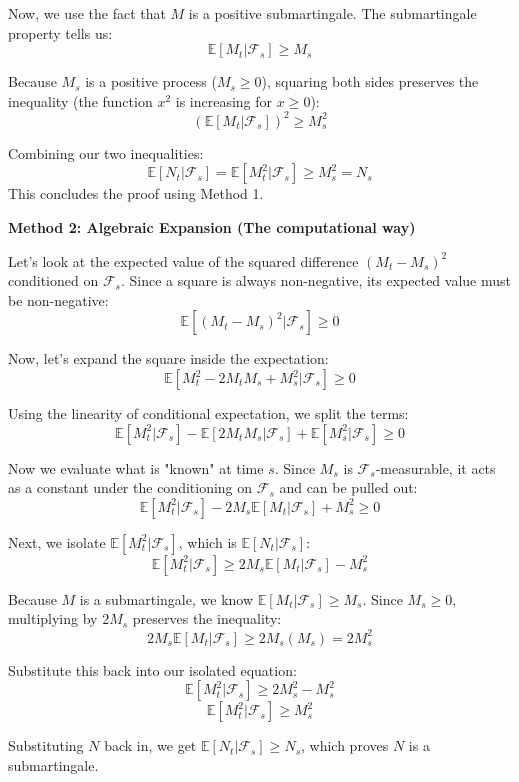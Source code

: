 Now, we use the fact that $M$ is a positive submartingale. The submartingale property tells us:
\[ \mathbb{E}[M_t | \mathcal{F}_s] \ge M_s \]

Because $M_s$ is a positive process ($M_s \ge 0$), squaring both sides preserves the inequality (the function $x^2$ is increasing for $x \ge 0$):
\[ (\mathbb{E}[M_t | \mathcal{F}_s])^2 \ge M_s^2 \]

Combining our two inequalities:
\[ \mathbb{E}[N_t | \mathcal{F}_s] = \mathbb{E}[M_t^2 | \mathcal{F}_s] \ge M_s^2 = N_s \]
This concludes the proof using Method 1.

\vspace{0.5cm}
\textbf{Method 2: Algebraic Expansion (The computational way)}

Let's look at the expected value of the squared difference $(M_t - M_s)^2$ conditioned on $\mathcal{F}_s$. Since a square is always non-negative, its expected value must be non-negative:
\[ \mathbb{E}[(M_t - M_s)^2 | \mathcal{F}_s] \ge 0 \]

Now, let's expand the square inside the expectation:
\[ \mathbb{E}[M_t^2 - 2M_t M_s + M_s^2 | \mathcal{F}_s] \ge 0 \]

Using the linearity of conditional expectation, we split the terms:
\[ \mathbb{E}[M_t^2 | \mathcal{F}_s] - \mathbb{E}[2M_t M_s | \mathcal{F}_s] + \mathbb{E}[M_s^2 | \mathcal{F}_s] \ge 0 \]

Now we evaluate what is "known" at time $s$. Since $M_s$ is $\mathcal{F}_s$-measurable, it acts as a constant under the conditioning on $\mathcal{F}_s$ and can be pulled out:
\[ \mathbb{E}[M_t^2 | \mathcal{F}_s] - 2M_s \mathbb{E}[M_t | \mathcal{F}_s] + M_s^2 \ge 0 \]

Next, we isolate $\mathbb{E}[M_t^2 | \mathcal{F}_s]$, which is $\mathbb{E}[N_t | \mathcal{F}_s]$:
\[ \mathbb{E}[M_t^2 | \mathcal{F}_s] \ge 2M_s \mathbb{E}[M_t | \mathcal{F}_s] - M_s^2 \]

Because $M$ is a submartingale, we know $\mathbb{E}[M_t | \mathcal{F}_s] \ge M_s$. Since $M_s \ge 0$, multiplying by $2M_s$ preserves the inequality:
\[ 2M_s \mathbb{E}[M_t | \mathcal{F}_s] \ge 2M_s(M_s) = 2M_s^2 \]

Substitute this back into our isolated equation:
\[ \mathbb{E}[M_t^2 | \mathcal{F}_s] \ge 2M_s^2 - M_s^2 \]
\[ \mathbb{E}[M_t^2 | \mathcal{F}_s] \ge M_s^2 \]

Substituting $N$ back in, we get $\mathbb{E}[N_t | \mathcal{F}_s] \ge N_s$, which proves $N$ is a submartingale.
